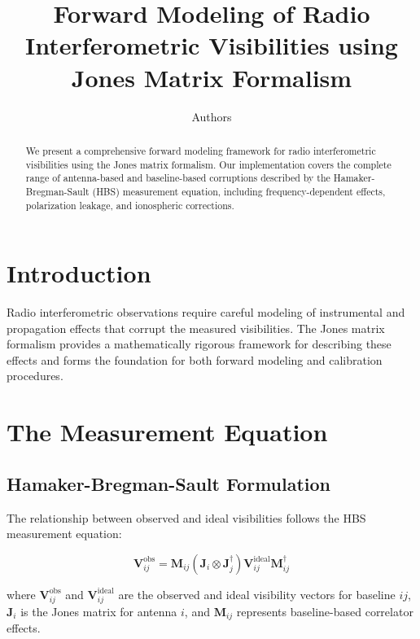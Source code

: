 \documentclass{aastex631}
\begin{document}
\title{Forward Modeling of Radio Interferometric Visibilities using Jones Matrix Formalism}

\author{Authors}

\begin{abstract}
We present a comprehensive forward modeling framework for radio interferometric visibilities using the Jones matrix formalism. Our implementation covers the complete range of antenna-based and baseline-based corruptions described by the Hamaker-Bregman-Sault (HBS) measurement equation, including frequency-dependent effects, polarization leakage, and ionospheric corrections.
\end{abstract}


\section{Introduction}

Radio interferometric observations require careful modeling of instrumental and propagation effects that corrupt the measured visibilities. The Jones matrix formalism provides a mathematically rigorous framework for describing these effects and forms the foundation for both forward modeling and calibration procedures.

\section{The Measurement Equation}

\subsection{Hamaker-Bregman-Sault Formulation}

The relationship between observed and ideal visibilities follows the HBS measurement equation:

\begin{equation}
\mathbf{V}_{ij}^{\mathrm{obs}} = \mathbf{M}_{ij} \left( \mathbf{J}_i \otimes \mathbf{J}_j^{\dagger} \right) \mathbf{V}_{ij}^{\mathrm{ideal}} \mathbf{M}_{ij}^{\dagger}
\end{equation}

where $\mathbf{V}_{ij}^{\mathrm{obs}}$ and $\mathbf{V}_{ij}^{\mathrm{ideal}}$ are the observed and ideal visibility vectors for baseline $ij$, $\mathbf{J}_i$ is the Jones matrix for antenna $i$, and $\mathbf{M}_{ij}$ represents baseline-based correlator effects.
\end{document}

